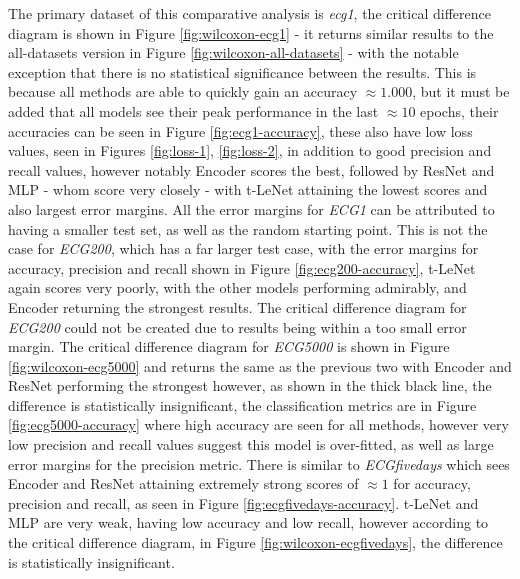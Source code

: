 \documentclass[journal]{IEEEtran}
\begin{document}
The primary dataset of this comparative analysis is \textit{ecg1}, the critical difference diagram is shown in Figure \ref{fig:wilcoxon-ecg1} - it returns similar results to the all-datasets version in Figure \ref{fig:wilcoxon-all-datasets} - with the notable exception that there is no statistical significance between the results. This is because all methods are able to quickly gain an accuracy $ \approx1.000$, but it must be added that all models see their peak performance in the last $\approx10$ epochs, their accuracies can be seen in Figure \ref{fig:ecg1-accuracy}, these also have low loss values, seen in Figures \ref{fig:loss-1}, \ref{fig:loss-2}, in addition to good precision and recall values, however notably Encoder scores the best, followed by ResNet and MLP - whom score very closely - with t-LeNet attaining the lowest scores and also largest error margins. All the error margins for \textit{ECG1} can be attributed
to having a smaller test set, as well as the random starting point. This is not the case for \textit{ECG200}, which has a far larger test case, with the error margins for accuracy, precision and recall shown in Figure \ref{fig:ecg200-accuracy}, t-LeNet again scores very poorly, with the other models performing admirably, and Encoder returning the strongest results. The critical difference diagram for \textit{ECG200} could not be created due to results being within a too small error margin. The critical difference diagram for \textit{ECG5000} is shown in Figure \ref{fig:wilcoxon-ecg5000} and returns the same as the previous two with Encoder and ResNet performing the strongest however, as shown in the thick black line, the difference is statistically insignificant, the classification metrics are in Figure \ref{fig:ecg5000-accuracy} where high accuracy are seen for all methods, however very low precision and recall values suggest this model is over-fitted, as well as large error margins for the precision metric. There is similar to \textit{ECGfivedays} which sees Encoder and ResNet attaining extremely strong scores of $ \approx 1$ for accuracy, precision and recall, as seen in Figure \ref{fig:ecgfivedays-accuracy}. t-LeNet and MLP are very weak, having low accuracy and low recall, however according to the critical difference diagram, in Figure \ref{fig:wilcoxon-ecgfivedays}, the difference is statistically insignificant.
\end{document}
